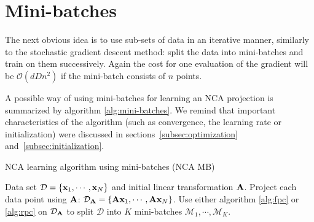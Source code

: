 \section{Mini-batches}
\label{sec:mini-batches}

The next obvious idea is to use sub-sets of data in an iterative manner, similarly to the
stochastic gradient descent method: split the data into mini-batches and train
on them successively. Again the cost for one evaluation of the gradient will be
$\mathcal{O}(dDn^2)$ if the mini-batch consists of $n$ points. 

A possible way of using mini-batches for learning an NCA projection is summarized by algorithm \ref{alg:mini-batches}. We remind that important characteristics of the algorithm (such as convergence, the learning rate or initialization) were discussed in sections~\ref{subsec:optimization} and~\ref{subsec:initialization}.

\begin{algorithm} 
	\caption{NCA learning algorithm using mini-batches (NCA MB)} 
	\label{alg:mini-batches}  
	\begin{algorithmic} [1]                 %
		\REQUIRE Data set $\mathcal{D}=\{\mathbf{x}_1,\cdots,\mathbf{x}_N\}$ and initial linear
transformation $\mathbf{A}$.
		\REPEAT
			\STATE Project each data point using $\mathbf{A}$: 
$\mathcal{D}_{\mathbf{A}}=\{\mathbf{A}\mathbf{x}_1,\cdots,\mathbf{A}\mathbf{x}_N\}$.
			\STATE Use either algorithm \ref{alg:fpc} or \ref{alg:rpc} on
$\mathcal{D}_{\mathbf{A}}$ to split $\mathcal{D}$  into $K$ mini-batches
$\mathcal{M}_1,\cdots,\mathcal{M}_K$.
			\ENDFOR
	\end{algorithmic}
\end{algorithm}

